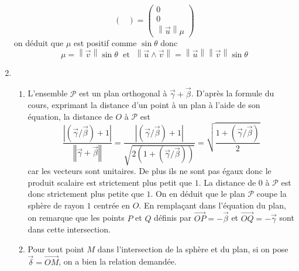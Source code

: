 \begin{enumerate}
\begin{displaymath}
\begin{pmatrix}
\end{pmatrix}
=
\begin{pmatrix}
 0 \\ 0 \\ \left\| \overrightarrow u\right\| \mu
\end{pmatrix}
\end{displaymath}
on déduit que $\mu$ est positif comme $\sin \theta$ donc
\begin{displaymath}
 \mu = \left\|\overrightarrow v\right\| \sin \theta \; \text{ et } \; 
 \left\| \overrightarrow u \wedge \overrightarrow v \right\| = \left\| \overrightarrow u \right\| \left\|\overrightarrow v \right\| \sin \theta
\end{displaymath}


 \item 
\begin{enumerate}
 \item L'ensemble $\mathcal P$ est un plan orthogonal à $\overrightarrow{\gamma} + \overrightarrow{\beta}$. D'après la formule du cours, exprimant la distance d'un point à un plan à l'aide de son équation, la distance de $O$ à $\mathcal{P}$ est
\begin{displaymath}
 \frac
{\left| (\overrightarrow{\gamma}/\overrightarrow{\beta}) + 1\right|}
{\left\Vert \overrightarrow{\gamma} + \overrightarrow{\beta}\right\Vert}
=
 \frac
{\left| (\overrightarrow{\gamma}/\overrightarrow{\beta}) + 1\right|}
{\sqrt{ 2(1+(\overrightarrow{\gamma} / \overrightarrow{\beta}))}}
= \sqrt{
 \frac
   { 1+(\overrightarrow{\gamma} / \overrightarrow{\beta})}{ 2} }
\end{displaymath}
car les vecteurs sont unitaires. De plus ils ne sont pas égaux donc le produit scalaire est strictement plus petit que $1$. La distance de $0$ à $\mathcal{P}$ est donc strictement plus petite que $1$.\newline
On en déduit que le plan $\mathcal{P}$ coupe la sphère de rayon $1$ centrée en $O$.\newline
En remplaçant dans l'équation du plan, on remarque que les points $P$ et $Q$ définis par $\overrightarrow{OP}=-\overrightarrow{\beta}$
 et $\overrightarrow{OQ}=-\overrightarrow{\gamma}$ sont dans cette intersection.

\item Pour tout point $M$ dans l'intersection de la sphère et du plan, si on pose $\overrightarrow \delta = \overrightarrow{OM}$, on a bien la relation demandée.


\end{enumerate}
\end{enumerate}
